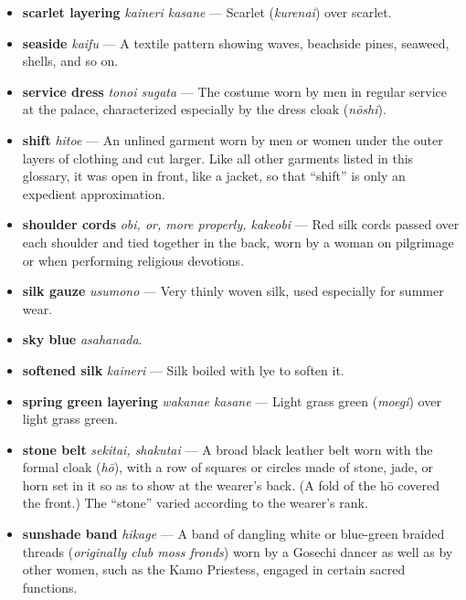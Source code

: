 \documentclass{article}
\begin{document}
\begin{multicols*}{2}
\begin{itemize}[
			label=,
			leftmargin=0em,
			rightmargin=-1.5em,
			itemindent=-2em,
			nosep,
		]
		\item \textbf{scarlet layering} \textit{kaineri kasane} --- Scarlet (\textit{kurenai}) over scarlet.

		\item \textbf{seaside} \textit{kaifu} --- A textile pattern showing waves, beachside pines, seaweed, shells, and so on.

		\item \textbf{service dress} \textit{tonoi sugata} --- The costume worn by men in regular service at the palace, characterized especially by the dress cloak (\textit{nōshi}).

		\item \textbf{shift} \textit{hitoe} --- An unlined garment worn by men or women under the outer layers of clothing and cut larger. Like all other garments listed in this glossary, it was open in front, like a jacket, so that “shift” is only an expedient approximation.

		\item \textbf{shoulder cords} \textit{obi, or, more properly, kakeobi} --- Red silk cords passed over each shoulder and tied together in the back, worn by a woman on pilgrimage or when performing religious devotions.

		\item \textbf{silk gauze} \textit{usumono} --- Very thinly woven silk, used especially for summer wear.

		\item \textbf{sky blue} \textit{asahanada}.

		\item \textbf{softened silk} \textit{kaineri} --- Silk boiled with lye to soften it.

		\item \textbf{spring green layering} \textit{wakanae kasane} --- Light grass green (\textit{moegi}) over light grass green.

		\item \textbf{stone belt} \textit{sekitai, shakutai} --- A broad black leather belt worn with the formal cloak (\textit{hō}), with a row of squares or circles made of stone, jade, or horn set in it so as to show at the wearer's back. (A fold of the hō covered the front.) The “stone” varied according to the wearer's rank.

		\item \textbf{sunshade band} \textit{hikage} --- A band of dangling white or blue-green braided threads (\textit{originally club moss fronds}) worn by a Gosechi dancer as well as by other women, such as the Kamo Priestess, engaged in certain sacred functions.


\end{itemize}
\end{multicols*}
\end{document}
